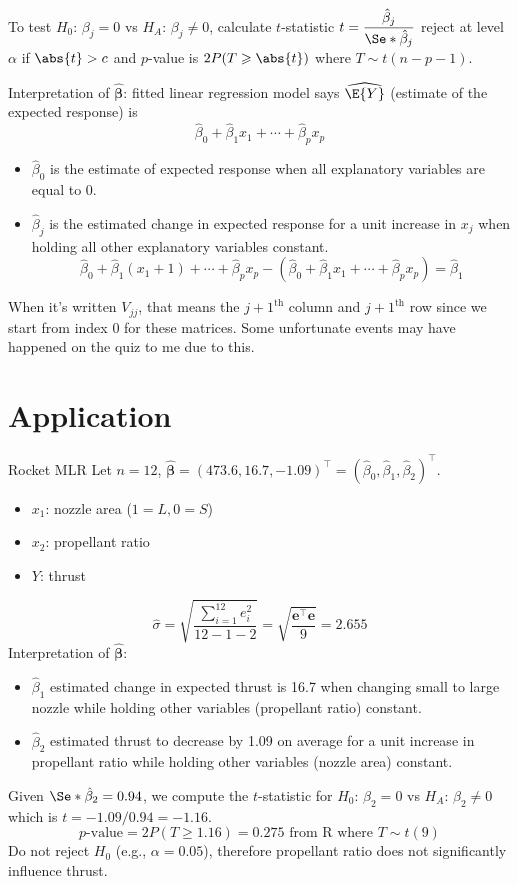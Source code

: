 To test $ H_0 $: $ \beta_j=0 $ vs $ H_A $: $ \beta_j\neq 0 $,
calculate $ t $-statistic
$ t=\dfrac{\hat{\beta}_j}{\Se*{\hat{\beta}_j}} $
reject at level $ \alpha $ if $ \abs{t}>c $ and
$ p $-value is $ 2P(T\geqslant \abs{t}) $ where $ T \sim t(n-p-1) $.

Interpretation of $ \hat{\symbf{\beta}} $: fitted linear
regression model says $ \widehat{\E{Y}} $
(estimate of the expected response) is
\[ \hat{\beta}_0+\hat{\beta}_1x_1+\cdots+\hat{\beta}_p x_p \]
\begin{itemize}
  \item $ \hat{\beta}_0 $ is the estimate of expected response
        when all explanatory variables are equal to 0.
  \item $ \hat{\beta}_j $ is the estimated change
        in expected response for a unit increase in $ x_j $
        when holding all other explanatory variables constant.
        \[ \hat{\beta}_0+\hat{\beta}_1(x_1+1)+\cdots+\hat{\beta}_p x_p
          -(\hat{\beta}_0+\hat{\beta}_1 x_1+\cdots+\hat{\beta}_p x_p)=\hat{\beta}_1 \]
\end{itemize}

\begin{Remark}{}{}
  When it's written $ V_{jj} $, that means the $ j+1^{\text{th}} $
  column and $ j+1^{\text{th}} $ row since we start from index $ 0 $
  for these matrices. Some unfortunate events may have happened
  on the quiz to me due to this.
\end{Remark}
\section{Application}
\begin{Example}{Rocket MLR}{}
  Let $ n=12 $, $ \hat{\symbf{\beta}}=(473.6, 16.7,-1.09)^\top
    =(\hat{\beta}_0,\hat{\beta}_1,\hat{\beta}_2)^\top $.
  \begin{itemize}
    \item $ x_1 $: nozzle area ($ 1 = L,0=S $)
    \item $ x_2 $: propellant ratio
    \item $ Y $: thrust
  \end{itemize}
  \[ \hat{\sigma}=\sqrt{\frac{\sum\limits_{i=1}^{12} e_i^2}{12-1-2}}=
    \sqrt{\frac{\symbf{e}^\top \symbf{e}}{9}}=
    2.655 \]
  Interpretation of $ \hat{\symbf{\beta}} $:
  \begin{itemize}
    \item $ \hat{\beta}_1 $ estimated change in expected thrust is 16.7
          when changing small to large nozzle while holding other variables
          (propellant ratio) constant.
    \item $ \hat{\beta}_2 $ estimated thrust to decrease by 1.09 on average
          for a unit increase in propellant ratio while holding other
          variables (nozzle area) constant.
  \end{itemize}
  Given $ \Se*{\hat{\beta}_2}=0.94 $,
  we compute the $ t $-statistic for $ H_0 $: $ \beta_2=0 $ vs $ H_A $: $ \beta_2\neq 0 $
  which is $ t=-1.09/0.94=-1.16 $.
  \[ p\text{-value}=2P(T\geqslant 1.16)=0.275\text{ from R where } T \sim t(9)\]
  Do not reject $ H_0 $ (e.g., $ \alpha=0.05 $), therefore
  propellant ratio does not significantly influence thrust.
\end{Example}
